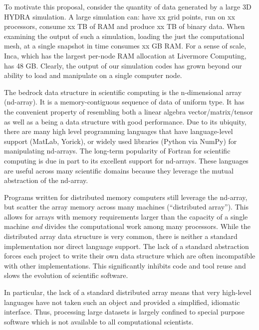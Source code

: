 \documentclass[letterpaper,11pt]{article}
\begin{document}
To motivate this proposal, consider the quantity of data generated
by a large 3D HYDRA simulation.  A large simulation can:
have
	xx grid points,
run on 
	xx processors,
consume 
	xx TB of RAM and
produce 
	xx TB of binary data.  When examining the output of such a simulation, loading the
just the computational mesh, at a single snapshot in time consumes
	xx GB RAM\@.  For a sense of scale, Inca, which has the largest per-node RAM allocation 
at Livermore Computing, has 48 GB\@.  Clearly, the output of our simulation codes has grown
beyond our ability to load and manipulate on a single computer node.

The bedrock data structure in scientific computing is the n-dimensional array (nd-array).  
It is a memory-contiguous sequence of data of uniform type.  It has the convenient property 
of resembling both a linear algebra vector/matrix/tensor as well as a being a data structure
with good performance.  Due to its ubiquity, there are many high level programming 
languages that have language-level support (MatLab\cite{matlab}, Yorick\cite{Munro1995}), 
or widely used libraries (Python\cite{CPython} via NumPy\cite{Oliphant2006}) for 
manipulating nd-arrays.  The long-term popularity of Fortran for scientific computing is 
due in part to its excellent support for nd-arrays.  These languages are useful across 
many scientific domains because they leverage the mutual abstraction of the nd-array.

Programs written for distributed memory computers still leverage the nd-array, but scatter 
the array memory across many machines (``distributed array'').  This allows for arrays 
with memory requirements larger than the capacity of a single machine \emph{and} divides 
the computational work among many processors.  While the distributed array data structure 
is very common, there is neither a standard implementation nor direct language support.  
The lack of a standard abstraction forces each project to write their own data structure 
which are often incompatible with other implementations.  This significantly inhibits code
and tool reuse and slows the evolution of scientific software.

In particular, the lack of a standard distributed array means that very high-level 
languages have not taken such an object and provided a simplified, idiomatic interface.
Thus, processing large datasets is largely confined to special purpose software which is 
not available to all computational scientists.
\end{document}
